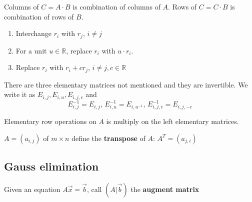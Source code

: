 \begin{remark}
    Columns of  $ C=A\cdot B  $ is combination of columns of  $ A  $.
    Rows of  $ C=C\cdot  B  $ is combination of rows of  $ B  $.
\end{remark}
\begin{definition}
    \begin{enumerate}[Type 1:]
        \item Interchange  $ r_i  $ with  $ r_j $, $ i\not=j $ 
        \item  For a unit  $ u\in \mathbb{R} $, replace  $ r_i  $ with  $ u\cdot r_i  $.
        \item Replace  $ r_i  $ with  $ r_i+cr_j  $, $ i\not=j,c\in \mathbb{R } $ 
    \end{enumerate}
\end{definition}
There are three elementary matrices not mentioned and they are invertible.
We write it as  $ E_{i,j},E_{i,u},E_{i,j,c} $ and 
\[E_{i,j}^{-1}=E_{i,j},\,E_{i,u}^{-1}=E_{i,u^{-1}},\,E_{i,j,c}^{-1}=E_{i,j,-c}\] 
\begin{remark}
    Elementary row operations on  $ A $ is multiply on the left elementary matrices.
\end{remark}
\begin{definition}[Transpose]
     $ A=(a_{i,j}) $ of  $ m\times n  $ define the \textbf{transpose} of  $ A  $:
      $ A^T=(a_{j,i}) $ 
\end{definition}
\subsection{Gauss elimination}
Given an equation  $ A\vec{x}=\vec{b} $, call  $ (A|\vec{b}) $ the \textbf{augment matrix}
